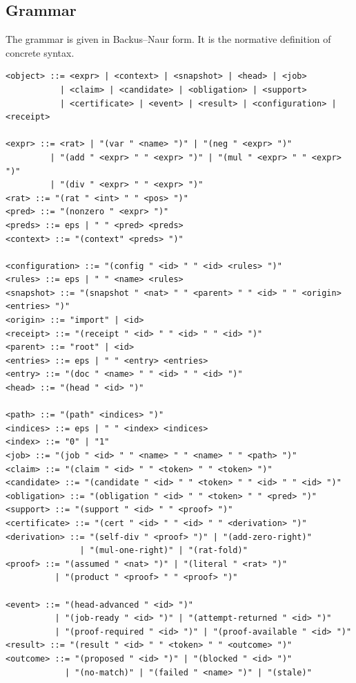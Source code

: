 \documentclass[11pt,a4paper]{article}
\theoremstyle{plain}
\theoremstyle{definition}
\theoremstyle{remark}
\theoremstyle{definition}
\begin{document}
\subsection{Grammar}

The grammar is given in Backus--Naur form. It is the normative definition of concrete syntax.

\begin{Verbatim}[fontsize=\footnotesize,frame=lines,framesep=3mm]
<object> ::= <expr> | <context> | <snapshot> | <head> | <job>
           | <claim> | <candidate> | <obligation> | <support>
           | <certificate> | <event> | <result> | <configuration> | <receipt>

<expr> ::= <rat> | "(var " <name> ")" | "(neg " <expr> ")"
         | "(add " <expr> " " <expr> ")" | "(mul " <expr> " " <expr> ")"
         | "(div " <expr> " " <expr> ")"
<rat> ::= "(rat " <int> " " <pos> ")"
<pred> ::= "(nonzero " <expr> ")"
<preds> ::= eps | " " <pred> <preds>
<context> ::= "(context" <preds> ")"

<configuration> ::= "(config " <id> " " <id> <rules> ")"
<rules> ::= eps | " " <name> <rules>
<snapshot> ::= "(snapshot " <nat> " " <parent> " " <id> " " <origin> <entries> ")"
<origin> ::= "import" | <id>
<receipt> ::= "(receipt " <id> " " <id> " " <id> ")"
<parent> ::= "root" | <id>
<entries> ::= eps | " " <entry> <entries>
<entry> ::= "(doc " <name> " " <id> " " <id> ")"
<head> ::= "(head " <id> ")"

<path> ::= "(path" <indices> ")"
<indices> ::= eps | " " <index> <indices>
<index> ::= "0" | "1"
<job> ::= "(job " <id> " " <name> " " <name> " " <path> ")"
<claim> ::= "(claim " <id> " " <token> " " <token> ")"
<candidate> ::= "(candidate " <id> " " <token> " " <id> " " <id> ")"
<obligation> ::= "(obligation " <id> " " <token> " " <pred> ")"
<support> ::= "(support " <id> " " <proof> ")"
<certificate> ::= "(cert " <id> " " <id> " " <derivation> ")"
<derivation> ::= "(self-div " <proof> ")" | "(add-zero-right)"
               | "(mul-one-right)" | "(rat-fold)"
<proof> ::= "(assumed " <nat> ")" | "(literal " <rat> ")"
          | "(product " <proof> " " <proof> ")"

<event> ::= "(head-advanced " <id> ")"
          | "(job-ready " <id> ")" | "(attempt-returned " <id> ")"
          | "(proof-required " <id> ")" | "(proof-available " <id> ")"
<result> ::= "(result " <id> " " <token> " " <outcome> ")"
<outcome> ::= "(proposed " <id> ")" | "(blocked " <id> ")"
            | "(no-match)" | "(failed " <name> ")" | "(stale)"
\end{Verbatim}
\end{document}
